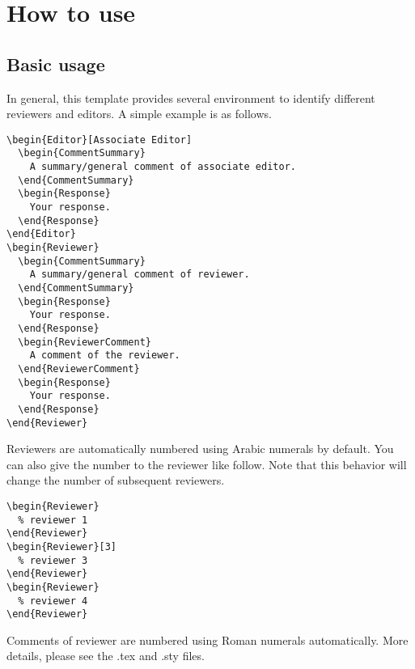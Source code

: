 \section{How to use}

\subsection{Basic usage}

In general, this template provides several environment to identify different reviewers and editors.
A simple example is as follows.

\begin{verbatim}
\begin{Editor}[Associate Editor]
  \begin{CommentSummary}
    A summary/general comment of associate editor.
  \end{CommentSummary}
  \begin{Response}
    Your response.
  \end{Response}
\end{Editor}
\begin{Reviewer}
  \begin{CommentSummary}
    A summary/general comment of reviewer.
  \end{CommentSummary}
  \begin{Response}
    Your response.
  \end{Response}
  \begin{ReviewerComment}
    A comment of the reviewer.
  \end{ReviewerComment}
  \begin{Response}
    Your response.
  \end{Response}
\end{Reviewer}
\end{verbatim}

Reviewers are automatically numbered using Arabic numerals by default.
You can also give the number to the reviewer like follow. 
Note that this behavior will change the number of subsequent reviewers.
\begin{verbatim}
\begin{Reviewer}
  % reviewer 1
\end{Reviewer}
\begin{Reviewer}[3]
  % reviewer 3
\end{Reviewer}
\begin{Reviewer}
  % reviewer 4
\end{Reviewer}
\end{verbatim}
Comments of reviewer are numbered using Roman numerals automatically.
More details, please see the .tex and .sty files.

